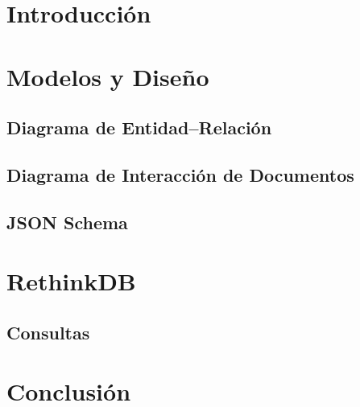 \documentclass[hidelinks,a4paper,11pt, nofootinbib]{article}
\begin{document}
\maketitle

\tableofcontents
\newpage

\section{Introducción}

\newpage

\section{Modelos y Diseño}
\subsection{Diagrama de Entidad--Relación}

\newpage

\subsection{Diagrama de Interacción de Documentos}

\newpage


\subsection{JSON Schema}

\newpage

\section{RethinkDB}


\newpage
\subsection{Consultas}


\section{Conclusión}

\newpage


%
%
\end{document}
